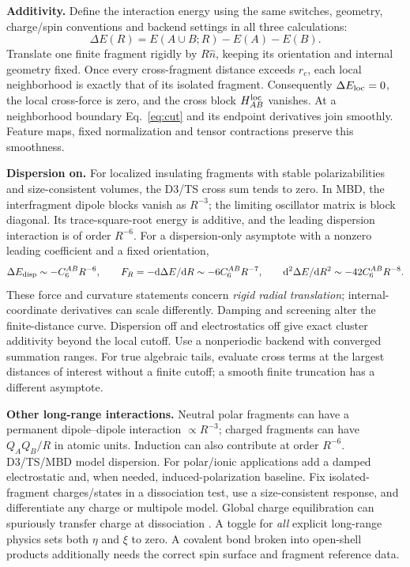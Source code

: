 \documentclass[11pt,a4paper]{article}
\begin{document}
\textbf{Additivity.} Define the interaction energy using the same switches, geometry, charge/spin conventions and backend settings in all three calculations:
\begin{equation}
 \Delta E(R)=E(A\cup B;R)-E(A)-E(B).
 \label{eq:sep}
\end{equation}
Translate one finite fragment rigidly by $R\hat n$, keeping its orientation and internal geometry fixed. Once every cross-fragment distance exceeds $r_c$, each local neighborhood is exactly that of its isolated fragment. Consequently $\Delta E_{\rm loc}=0$, the local cross-force is zero, and the cross block $H_{AB}^{\rm loc}$ vanishes. At a neighborhood boundary Eq.~\eqref{eq:cut} and its endpoint derivatives join smoothly. Feature maps, fixed normalization and tensor contractions preserve this smoothness.

\textbf{Dispersion on.} For localized insulating fragments with stable polarizabilities and size-consistent volumes, the D3/TS cross sum tends to zero. In MBD, the interfragment dipole blocks vanish as $R^{-3}$; the limiting oscillator matrix is block diagonal. Its trace-square-root energy is additive, and the leading dispersion interaction is of order $R^{-6}$. For a dispersion-only asymptote with a nonzero leading coefficient and a fixed orientation,
\[
 \Delta E_{\rm disp}\sim-C_6^{AB}R^{-6},\qquad
 F_R=-\mathrm d\Delta E/\mathrm d R\sim-6C_6^{AB}R^{-7},\qquad
 \mathrm d^2\Delta E/\mathrm d R^2\sim-42C_6^{AB}R^{-8}.
\]
These force and curvature statements concern \emph{rigid radial translation}; internal-coordinate derivatives can scale differently. Damping and screening alter the finite-distance curve. Dispersion off and electrostatics off give exact cluster additivity beyond the local cutoff. Use a nonperiodic backend with converged summation ranges. For true algebraic tails, evaluate cross terms at the largest distances of interest without a finite cutoff; a smooth finite truncation has a different asymptote.

\textbf{Other long-range interactions.} Neutral polar fragments can have a permanent dipole--dipole interaction $\propto R^{-3}$; charged fragments can have $Q_AQ_B/R$ in atomic units. Induction can also contribute at order $R^{-6}$. D3/TS/MBD model dispersion. For polar/ionic applications add a damped electrostatic and, when needed, induced-polarization baseline. Fix isolated-fragment charges/states in a dissociation test, use a size-consistent response, and differentiate any charge or multipole model. Global charge equilibration can spuriously transfer charge at dissociation \cite{charge}. A toggle for \emph{all} explicit long-range physics sets both $\eta$ and $\xi$ to zero. A covalent bond broken into open-shell products additionally needs the correct spin surface and fragment reference data.
\end{document}
